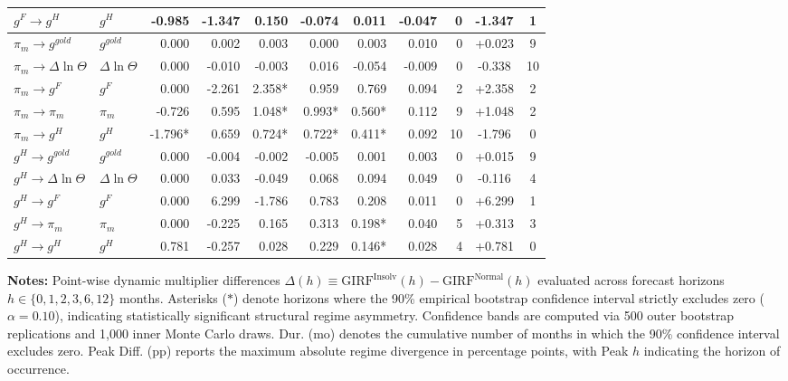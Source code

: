 \begin{table}[htbp]
{\begin{tabular}{llrrrrrrrcc}
$g^F \to g^H$ & $g^H$ & -0.985 & -1.347 & 0.150 & -0.074 & 0.011 & -0.047 & 0 & -1.347 & 1 \\
\midrule
$\pi_m \to g^{gold}$ & $g^{gold}$ & 0.000 & 0.002 & 0.003 & 0.000 & 0.003 & 0.010 & 0 & +0.023 & 9 \\
$\pi_m \to \Delta\ln\Theta$ & $\Delta\ln\Theta$ & 0.000 & -0.010 & -0.003 & 0.016 & -0.054 & -0.009 & 0 & -0.338 & 10 \\
$\pi_m \to g^F$ & $g^F$ & 0.000 & -2.261 & 2.358* & 0.959 & 0.769 & 0.094 & 2 & +2.358 & 2 \\
$\pi_m \to \pi_m$ & $\pi_m$ & -0.726 & 0.595 & 1.048* & 0.993* & 0.560* & 0.112 & 9 & +1.048 & 2 \\
$\pi_m \to g^H$ & $g^H$ & -1.796* & 0.659 & 0.724* & 0.722* & 0.411* & 0.092 & 10 & -1.796 & 0 \\
\midrule
$g^H \to g^{gold}$ & $g^{gold}$ & 0.000 & -0.004 & -0.002 & -0.005 & 0.001 & 0.003 & 0 & +0.015 & 9 \\
$g^H \to \Delta\ln\Theta$ & $\Delta\ln\Theta$ & 0.000 & 0.033 & -0.049 & 0.068 & 0.094 & 0.049 & 0 & -0.116 & 4 \\
$g^H \to g^F$ & $g^F$ & 0.000 & 6.299 & -1.786 & 0.783 & 0.208 & 0.011 & 0 & +6.299 & 1 \\
$g^H \to \pi_m$ & $\pi_m$ & 0.000 & -0.225 & 0.165 & 0.313 & 0.198* & 0.040 & 5 & +0.313 & 3 \\
$g^H \to g^H$ & $g^H$ & 0.781 & -0.257 & 0.028 & 0.229 & 0.146* & 0.028 & 4 & +0.781 & 0 \\
\bottomrule
\end{tabular}}
\begin{minipage}{\textwidth}
\vspace{0.3em}
\footnotesize \textbf{Notes:} Point-wise dynamic multiplier differences $\Delta(h) \equiv \text{GIRF}^{\text{Insolv}}(h) - \text{GIRF}^{\text{Normal}}(h)$ evaluated across forecast horizons $h \in \{0, 1, 2, 3, 6, 12\}$ months. Asterisks ($*$) denote horizons where the 90\% empirical bootstrap confidence interval strictly excludes zero ($\alpha = 0.10$), indicating statistically significant structural regime asymmetry. Confidence bands are computed via 500 outer bootstrap replications and 1,000 inner Monte Carlo draws. Dur. (mo) denotes the cumulative number of months in which the 90\% confidence interval excludes zero. Peak Diff. (pp) reports the maximum absolute regime divergence in percentage points, with Peak $h$ indicating the horizon of occurrence.
\end{minipage}
\end{table}